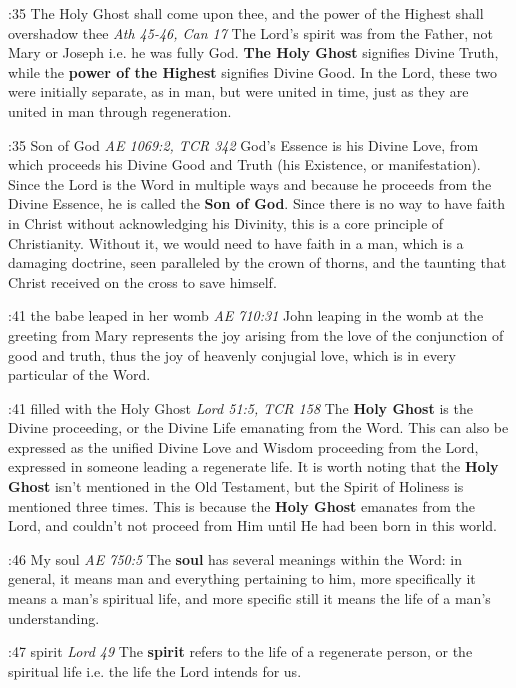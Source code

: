 :35 {The Holy Ghost shall come upon thee, and the power of the Highest shall overshadow thee}
{\it Ath 45-46, Can 17} The Lord's spirit was from the Father, not Mary or Joseph i.e. he was fully God. {\bf The Holy Ghost} signifies Divine Truth, while the {\bf power of the Highest} signifies Divine Good. In the Lord, these two were initially separate, as in man, but were united in time, just as they are united in man through regeneration.

:35 {Son of God}
{\it AE 1069:2, TCR 342} God's Essence is his Divine Love, from which proceeds his Divine Good and Truth (his Existence, or manifestation). Since the Lord is the Word in multiple ways and because he proceeds from the Divine Essence, he is called the {\bf Son of God}. Since there is no way to have faith in Christ without acknowledging his Divinity, this is a core principle of Christianity. Without it, we would need to have faith in a man, which is a damaging doctrine, seen paralleled by the crown of thorns, and the taunting that Christ received on the cross to save himself.

:41 {the babe leaped in her womb}
{\it AE 710:31} John leaping in the womb at the greeting from Mary represents the joy arising from the love of the conjunction of good and truth, thus the joy of heavenly conjugial love, which is in every particular of the Word. 

:41 {filled with the Holy Ghost}
{\it Lord 51:5, TCR 158} The {\bf Holy Ghost} is the Divine proceeding, or the Divine Life emanating from the Word. This can also be expressed as the unified Divine Love and Wisdom proceeding from the Lord, expressed in someone leading a regenerate life. It is worth noting that the {\bf Holy Ghost} isn't mentioned in the Old Testament, but the Spirit of Holiness is mentioned three times. This is because the {\bf Holy Ghost} emanates from the Lord, and couldn't not proceed from Him until He had been born in this world.

:46 {My soul}
{\it AE 750:5} The {\bf soul} has several meanings within the Word: in general, it means man and everything pertaining to him, more specifically it means a man's spiritual life, and more specific still it means the life of a man's understanding.

:47 {spirit}
{\it Lord 49} The {\bf spirit} refers to the life of a regenerate person, or the spiritual life i.e. the life the Lord intends for us.

